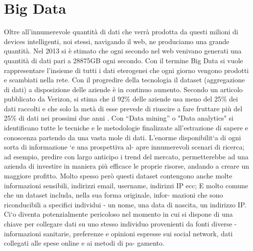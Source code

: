 \section{Big Data}
Oltre all'innumerevole quantità di dati che verrà prodotta da questi milioni di
devices intelligenti, noi stessi,  navigando il web, ne produciamo una grande
quantità. Nel 2013 si è stimato che ogni secondo nel web venivano generati una
quantità di dati pari a 28875GB ogni secondo. Con il  termine Big Data si vuole
rappresentare l'insieme di tutti i dati eterogenei che ogni giorno vengono
prodotti e scambiati nella rete.
Con il progredire della tecnologia il dataset (aggregazione di dati) a
disposizione delle aziende è in continuo aumento.
Secondo un articolo pubblicato da Verizon, si stima che il 92\% delle aziende
usa meno del 25\% dei dati raccolti e che solo la metà  di esse prevede di
riuscire a fare fruttare più del 25\% di dati nei prossimi due anni
\cite{Verizon}.  Con “Data mining” o "Data analytics"  si identificano tutte le
tecniche e le metodologie finalizzate all’estrazione di sapere e conoscenza
partendo da una vasta mole di dati.
L’enorme disponibilit`a di ogni sorta di informazione `e una prospettiva al-
apre innumerevoli scenari di ricerca; ad esempio, predire con largo anticipo i 
trend del mercato, permetterebbe ad una azienda di investire in maniera più
efficace le proprie risorse, andando a creare un maggiore profitto.
Molto spesso però questi dataset contengono anche molte informazioni sensibili, 
indirizzi email, username, indirizzi IP ecc; 
E molto comune che un dataset includa, nella sua forma originale, infor-
mazioni che sono riconducibili a specifici individui - un nome, una data di
nascita, un indirizzo IP. Ci`o diventa potenzialmente pericoloso nel momento
in  cui  si  dispone  di  una  chiave  per  collegare  dati  su  uno  stesso  individuo
provenienti  da  fonti  diverse  -  informazioni  sanitarie,  preferenze  e  opinioni
espresse sui social network, dati collegati alle spese online e ai metodi di pa-
gamento.

